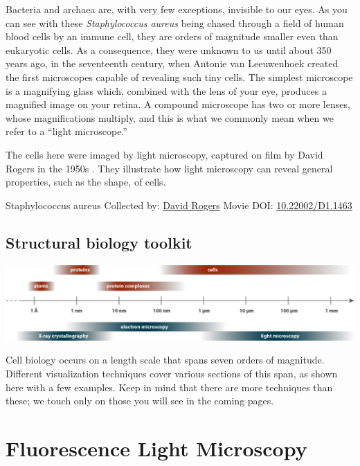 \documentclass[]{tufte-book}
\begin{document}
Bacteria and archaea are, with very few exceptions, invisible to our eyes. As you can see with these \emph{Staphylococcus aureus} being chased through a field of human blood cells by an immune cell, they are orders of magnitude smaller even than eukaryotic cells. As a consequence, they were unknown to us until about 350 years ago, in the seventeenth century, when Antonie van Leeuwenhoek created the first microscopes capable of revealing such tiny cells. The simplest microscope is a magnifying glass which, combined with the lens of your eye, produces a magnified image on your retina. A compound microscope has two or more lenses, whose magnifications multiply, and this is what we commonly mean when we refer to a ``light microscope.''

The cells here were imaged by light microscopy, captured on film by David Rogers in the 1950s \citep{hillInternet}. They illustrate how light microscopy can reveal general properties, such as the shape, of cells.



\hypertarget{htmlwidget-e1dfe4e5b07ed1322d1c}{}

\label{fig:1-1}Staphylococcus aureus Collected by: \protect\hyperlink{david_rogers}{David Rogers} Movie DOI: \href{https://doi.org/10.22002/D1.1463}{10.22002/D1.1463}

\hypertarget{Structural_biology_toolkit}{%
\subsection{Structural biology toolkit}\label{Structural_biology_toolkit}}

\includegraphics{img/schematics/1_1_1}

Cell biology occurs on a length scale that spans seven orders of magnitude. Different visualization techniques cover various sections of this span, as shown here with a few examples. Keep in mind that there are more techniques than these; we touch only on those you will see in the coming pages.

\hypertarget{fluorescence-light-microscopy}{%
\section{Fluorescence Light Microscopy}\label{fluorescence-light-microscopy}}
\end{document}
